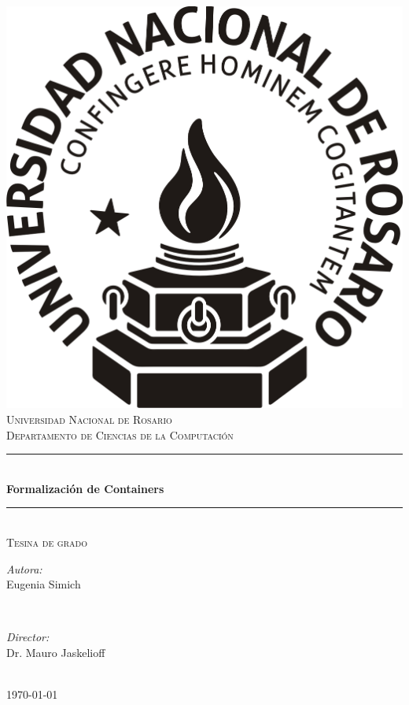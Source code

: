 \begin{titlepage}
\centering
\vspace*{0.5 cm}
        \includegraphics[width=3.0 cm]{img/logo.png}\\[1.0 cm]
        \textsc{\LARGE Universidad Nacional de Rosario}\\[0.5 cm]
	\textsc{\large Departamento de Ciencias de la Computaci\'{o}n}\\[2.5 cm]

	\rule{\linewidth}{0.3 mm} \\[0.4 cm]
	{ \huge \bfseries Formalización de Containers}\\
	\rule{\linewidth}{0.3 mm} \\[0.5 cm]
	\textsc{\Large Tesina de grado}\\[2.5 cm]
	
	\begin{minipage}{0.4\textwidth}
	\begin{flushleft} \large
	  \emph{Autora:}\\
	  Eugenia Simich \\
	\end{flushleft}
	\end{minipage}~
	\begin{minipage}{0.4\textwidth}
        \begin{flushright} \large
	  \emph{Director:} \\
	  Dr. Mauro Jaskelioff\\
	\end{flushright}        
	\end{minipage}\\[1.5 cm]
        \today

\end{titlepage}
